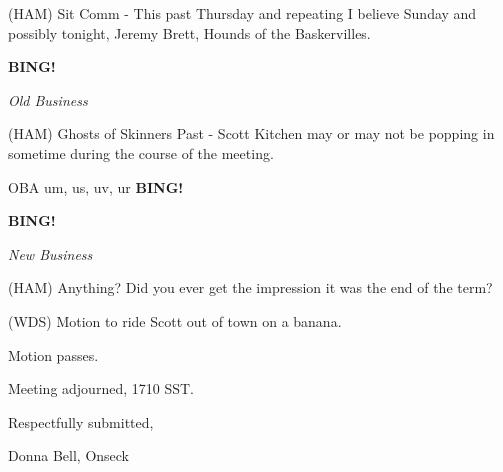 \documentclass[12pt]{article}
\newcommand{\bing}{{\bf BING!} }
\newcommand{\goto}[1]{\bing \vskip 12pt \centerline{{\em{#1}}}}
\begin{document}
(HAM) Sit Comm - This past Thursday and repeating I believe Sunday and possibly tonight, Jeremy Brett, Hounds of the Baskervilles.

\goto{Old Business}

(HAM) Ghosts of Skinners Past - Scott Kitchen may or may not be popping in sometime during the course of the meeting.

OBA um, us, uv, ur \bing

\goto{New Business}

(HAM) Anything? Did you ever get the impression it was the end of the term?

(WDS) Motion to ride Scott out of town on a banana.

Motion passes.

\vspace{12pt}

\noindent
Meeting adjourned, 1710 SST.

\vspace{18pt}

\centerline{Respectfully submitted,}
\centerline{Donna Bell, Onseck}
\end{document}
